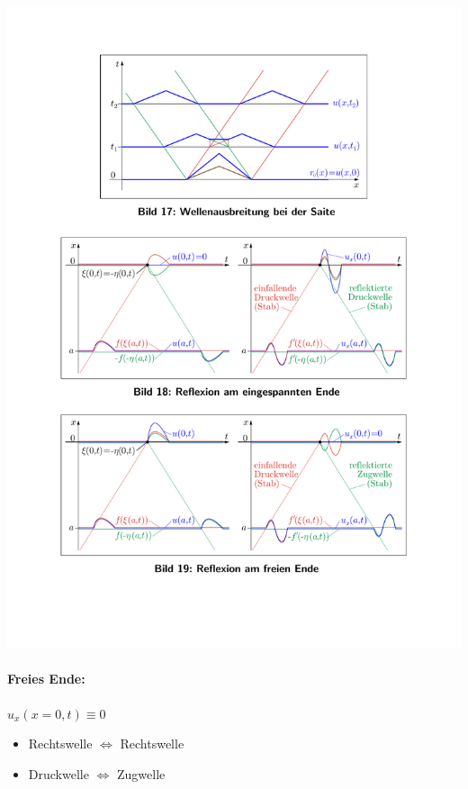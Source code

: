 \documentclass[9pt,fleqn,ngerman,article]{memoir}
\begin{document}
\begin{multicols*}{3}
					\begin{center}
						\includegraphics[width=\columnwidth]{grafiken/reflexion_eingespanntes_ende}
					\end{center}
				
				\paragraph{Freies Ende:} %
					$u_x(x=0,t) \equiv 0$
					
					\begin{itemize}
						\item Rechtswelle $\Longleftrightarrow$ Rechtswelle
						\item Druckwelle $\Longleftrightarrow$ Zugwelle
					\end{itemize}
					

\end{multicols*}
\end{document}
